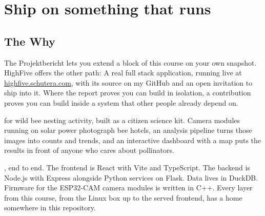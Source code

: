 
\chapter{Ship on something that runs}

\section{The Why}

The Projektbericht lets you extend a block of this course on your own snapshot.
HighFive offers the other path: A real full stack application, running live at
\href{https://highfive.schutera.com}{highfive.schutera.com}, with its source on my
GitHub and an open invitation to ship into it. Where the report proves you can build
in isolation, a contribution proves you can build inside a system that other people
already depend on.


 for wild bee nesting activity,
built as a citizen science kit. Camera modules running on solar power photograph bee hotels,
an analysis pipeline turns those images into counts and trends, and an interactive dashboard
with a map puts the results in front of anyone who cares about pollinators. 

, end to end.
The frontend is React with Vite and TypeScript. The backend is Node.js with Express
alongside Python services on Flask. Data lives in DuckDB. Firmware for the ESP32-CAM
camera modules is written in C++. Every layer from this course, from the Linux box up to the
served frontend, has a home somewhere in this repository.

